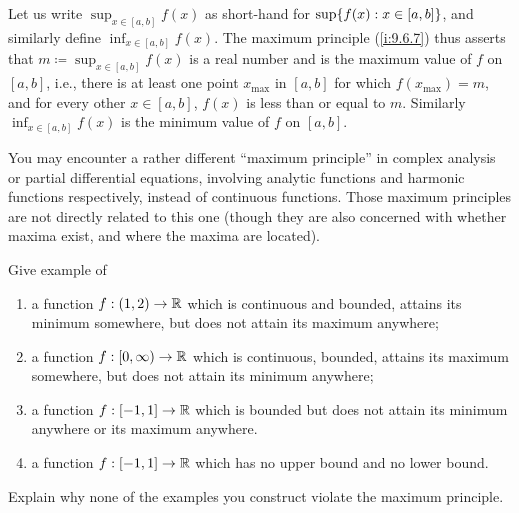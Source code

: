 \begin{note}
  Let us write \(\sup_{x \in [a, b]} f(x)\) as short-hand for \(\sup\set{f(x) : x \in [a, b]}\), and similarly define \(\inf_{x \in [a, b]} f(x)\).
  The maximum principle (\cref{i:9.6.7}) thus asserts that \(m \coloneqq \sup_{x \in [a, b]} f(x)\) is a real number and is the maximum value of \(f\) on \([a, b]\), i.e., there is at least one point \(x_{\max}\) in \([a, b]\) for which \(f(x_{\max}) = m\), and for every other \(x \in [a, b]\), \(f(x)\) is less than or equal to \(m\).
  Similarly \(\inf_{x \in [a, b]} f(x)\) is the minimum value of \(f\) on \([a, b]\).
\end{note}

\begin{rmk}\label{i:9.6.9}
  You may encounter a rather different ``maximum principle'' in complex analysis or partial differential equations, involving analytic functions and harmonic functions respectively, instead of continuous functions.
  Those maximum principles are not directly related to this one
  (though they are also concerned with whether maxima exist, and where the maxima are located).
\end{rmk}

\exercisesection

\begin{ex}\label{i:ex:9.6.1}
  Give example of
  \begin{enumerate}
    \item a function \(f : (1, 2) \to \mathbb{R}\) which is continuous and bounded, attains its minimum somewhere, but does not attain its maximum anywhere;
    \item a function \(f : [0, \infty) \to \mathbb{R}\) which is continuous, bounded, attains its maximum somewhere, but does not attain its minimum anywhere;
    \item a function \(f : [-1, 1] \to \mathbb{R}\) which is bounded but does not attain its minimum anywhere or its maximum anywhere.
    \item a function \(f : [-1, 1] \to \mathbb{R}\) which has no upper bound and no lower bound.
  \end{enumerate}
  Explain why none of the examples you construct violate the maximum principle.
\end{ex}

